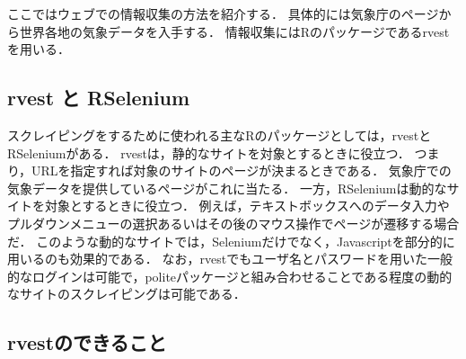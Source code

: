 \documentclass[
]{article}
\begin{document}
ここではウェブでの情報収集の方法を紹介する．
具体的には気象庁のページから世界各地の気象データを入手する．
情報収集にはRのパッケージであるrvestを用いる．

\hypertarget{rvest-ux3068-rselenium}{%
\subsection{rvest と RSelenium}\label{rvest-ux3068-rselenium}}

スクレイピングをするために使われる主なRのパッケージとしては，rvestとRSeleniumがある．
rvestは，静的なサイトを対象とするときに役立つ．
つまり，URLを指定すれば対象のサイトのページが決まるときである．
気象庁での気象データを提供しているページがこれに当たる．
一方，RSeleniumは動的なサイトを対象とするときに役立つ．
例えば，テキストボックスへのデータ入力やプルダウンメニューの選択あるいはその後のマウス操作でページが遷移する場合だ．
このような動的なサイトでは，Seleniumだけでなく，Javascriptを部分的に用いるのも効果的である．
なお，rvestでもユーザ名とパスワードを用いた一般的なログインは可能で，politeパッケージと組み合わせることである程度の動的なサイトのスクレイピングは可能である．

\hypertarget{rvestux306eux3067ux304dux308bux3053ux3068}{%
\subsection{rvestのできること}\label{rvestux306eux3067ux304dux308bux3053ux3068}}
\end{document}
